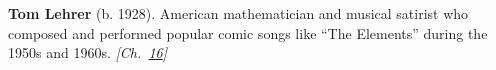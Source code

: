 \textbf{Tom Lehrer} (b. 1928). American mathematician and musical satirist who composed and performed popular comic songs like ``The Elements'' during the 1950s and 1960s. \emph{[Ch.~\hyperref[ch:falsevacuumthreat]{16}]}

